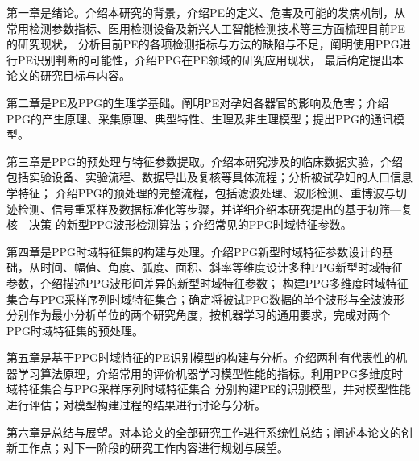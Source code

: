 第一章是绪论。介绍本研究的背景，介绍PE的定义、危害及可能的发病机制，从常用检测参数指标、医用检测设备及新兴人工智能检测技术等三方面梳理目前PE的研究现状，
分析目前PE的各项检测指标与方法的缺陷与不足，阐明使用PPG进行PE识别判断的可能性，介绍PPG在PE领域的研究应用现状，
最后确定提出本论文的研究目标与内容。

第二章是PE及PPG的生理学基础。阐明PE对孕妇各器官的影响及危害；介绍PPG的产生原理、采集原理、典型特性、生理及非生理模型；提出PPG的通讯模型。

第三章是PPG的预处理与特征参数提取。介绍本研究涉及的临床数据实验，介绍包括实验设备、实验流程、数据导出及复核等具体流程；分析被试孕妇的人口信息学特征；
介绍PPG的预处理的完整流程，包括滤波处理、波形检测、重博波与切迹检测、信号重采样及数据标准化等步骤，并详细介绍本研究提出的基于初筛—复核—决策
的新型PPG波形检测算法；介绍常见的PPG时域特征参数。

第四章是PPG时域特征集的构建与处理。介绍PPG新型时域特征参数设计的基础，从时间、幅值、角度、弧度、面积、斜率等维度设计多种PPG新型时域特征参数，介绍描述PPG波形间差异的新型时域特征参数；
构建PPG多维度时域特征集合与PPG采样序列时域特征集合；确定将被试PPG数据的单个波形与全波波形分别作为最小分析单位的两个研究角度，按机器学习的通用要求，完成对两个PPG时域特征集的预处理。

第五章是基于PPG时域特征的PE识别模型的构建与分析。介绍两种有代表性的机器学习算法原理，介绍常用的评价机器学习模型性能的指标。利用PPG多维度时域特征集合与PPG采样序列时域特征集合
分别构建PE的识别模型，并对模型性能进行评估；对模型构建过程的结果进行讨论与分析。

第六章是总结与展望。对本论文的全部研究工作进行系统性总结；阐述本论文的创新工作点；对下一阶段的研究工作内容进行规划与展望。